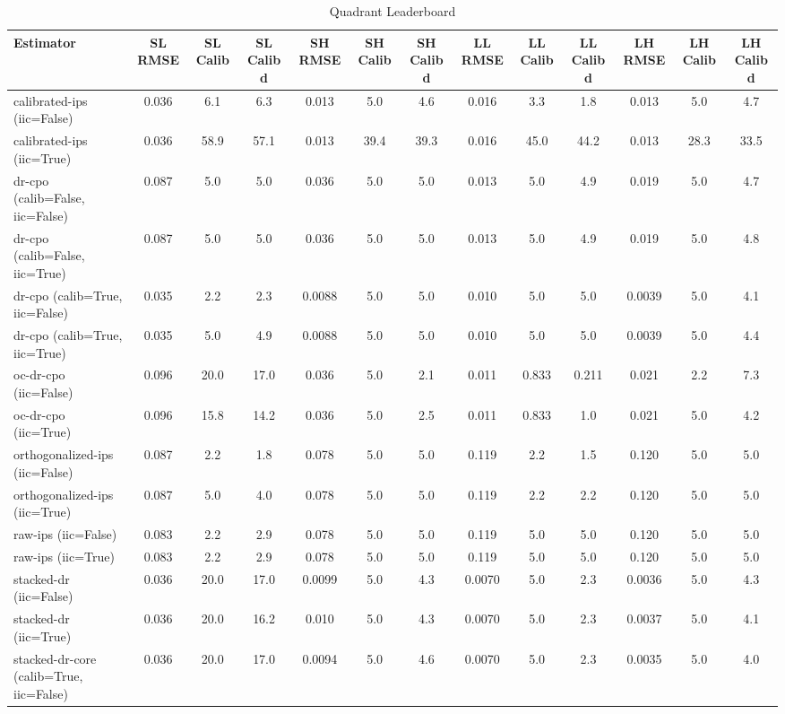 \begin{table}[htbp]
\centering
\caption{Quadrant Leaderboard}
\label{tab:A1}
\begin{tabular}{l|cccccccccccc}
\toprule
Estimator & SL RMSE & SL Calib & SL Calib d & SH RMSE & SH Calib & SH Calib d & LL RMSE & LL Calib & LL Calib d & LH RMSE & LH Calib & LH Calib d \\
\midrule
calibrated-ips (iic=False) & 0.036 & 6.1 & 6.3 & 0.013 & 5.0 & 4.6 & 0.016 & 3.3 & 1.8 & 0.013 & 5.0 & 4.7 \\
calibrated-ips (iic=True) & 0.036 & 58.9 & 57.1 & 0.013 & 39.4 & 39.3 & 0.016 & 45.0 & 44.2 & 0.013 & 28.3 & 33.5 \\
dr-cpo (calib=False, iic=False) & 0.087 & 5.0 & 5.0 & 0.036 & 5.0 & 5.0 & 0.013 & 5.0 & 4.9 & 0.019 & 5.0 & 4.7 \\
dr-cpo (calib=False, iic=True) & 0.087 & 5.0 & 5.0 & 0.036 & 5.0 & 5.0 & 0.013 & 5.0 & 4.9 & 0.019 & 5.0 & 4.8 \\
dr-cpo (calib=True, iic=False) & 0.035 & 2.2 & 2.3 & 0.0088 & 5.0 & 5.0 & 0.010 & 5.0 & 5.0 & 0.0039 & 5.0 & 4.1 \\
dr-cpo (calib=True, iic=True) & 0.035 & 5.0 & 4.9 & 0.0088 & 5.0 & 5.0 & 0.010 & 5.0 & 5.0 & 0.0039 & 5.0 & 4.4 \\
oc-dr-cpo (iic=False) & 0.096 & 20.0 & 17.0 & 0.036 & 5.0 & 2.1 & 0.011 & 0.833 & 0.211 & 0.021 & 2.2 & 7.3 \\
oc-dr-cpo (iic=True) & 0.096 & 15.8 & 14.2 & 0.036 & 5.0 & 2.5 & 0.011 & 0.833 & 1.0 & 0.021 & 5.0 & 4.2 \\
orthogonalized-ips (iic=False) & 0.087 & 2.2 & 1.8 & 0.078 & 5.0 & 5.0 & 0.119 & 2.2 & 1.5 & 0.120 & 5.0 & 5.0 \\
orthogonalized-ips (iic=True) & 0.087 & 5.0 & 4.0 & 0.078 & 5.0 & 5.0 & 0.119 & 2.2 & 2.2 & 0.120 & 5.0 & 5.0 \\
raw-ips (iic=False) & 0.083 & 2.2 & 2.9 & 0.078 & 5.0 & 5.0 & 0.119 & 5.0 & 5.0 & 0.120 & 5.0 & 5.0 \\
raw-ips (iic=True) & 0.083 & 2.2 & 2.9 & 0.078 & 5.0 & 5.0 & 0.119 & 5.0 & 5.0 & 0.120 & 5.0 & 5.0 \\
stacked-dr (iic=False) & 0.036 & 20.0 & 17.0 & 0.0099 & 5.0 & 4.3 & 0.0070 & 5.0 & 2.3 & 0.0036 & 5.0 & 4.3 \\
stacked-dr (iic=True) & 0.036 & 20.0 & 16.2 & 0.010 & 5.0 & 4.3 & 0.0070 & 5.0 & 2.3 & 0.0037 & 5.0 & 4.1 \\
stacked-dr-core (calib=True, iic=False) & 0.036 & 20.0 & 17.0 & 0.0094 & 5.0 & 4.6 & 0.0070 & 5.0 & 2.3 & 0.0035 & 5.0 & 4.0 \\

\end{tabular}
\end{table}
